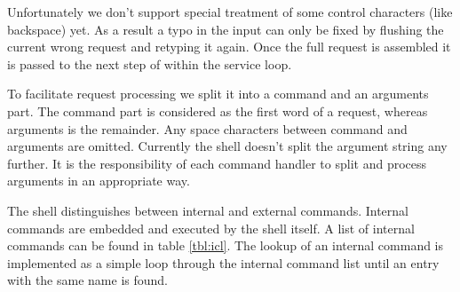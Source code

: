 \documentclass[a4paper,10pt]{article}
\begin{document}
Unfortunately we don't support special treatment of some control characters (like backspace) yet.
As a result a typo in the input can only be fixed by flushing the current wrong request and retyping it again.
Once the full request is assembled it is passed to the next step of within the service loop.
  
To facilitate request processing we split it into a command and an arguments part.
The command part is considered as the first word of a request, whereas arguments is the remainder.
Any space characters between command and arguments are omitted.
Currently the shell doesn't split the argument string any further.
It is the responsibility of each command handler to split and process arguments in an appropriate way. 

The shell distinguishes between internal and external commands.
Internal commands are embedded and executed by the shell itself.
A list of internal commands can be found in table \ref{tbl:icl}.
The lookup of an internal command is implemented as a simple loop through the internal command list until an entry with the same name is found. 
\end{document}
